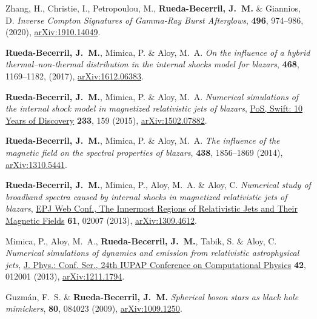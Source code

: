 \begin{thebibliography}{99}
 Zhang, H., Christie, I., Petropoulou, M., \textbf{Rueda-Becerril, J.~M.} \& Giannios, D. \textit{Inverse Compton Signatures of Gamma-Ray Burst Afterglows}, \href{https://doi.org/10.1093/mnras/staa1583}{\mnras} \textbf{496}, 974--986, (2020), \href{https://arxiv.org/abs/1910.14049}{arXiv:1910.14049}.

 \textbf{Rueda-Becerril, J.~M.}, Mimica, P. \& Aloy, M.~A. \textit{On the influence of a hybrid thermal--non-thermal distribution in the internal shocks model for blazars}, \href{https://doi.org/10.1093/mnras/stx476}{\mnras} \textbf{468}, 1169--1182, (2017), \href{https://arxiv.org/abs/1612.06383}{arXiv:1612.06383}.

 \textbf{Rueda-Becerril, J.~M.}, Mimica, P. \& Aloy, M.~A. \emph{Numerical simulations of the internal shock model in magnetized relativistic jets of blazars}, \href{https://doi.org/10.22323/1.233.0159}{PoS, Swift: 10 Years of Discovery} \textbf{233}, 159 (2015), \href{https://arxiv.org/abs/1502.07882}{arXiv:1502.07882}.

 \textbf{Rueda-Becerril, J.~M.}, Mimica, P. \& Aloy, M.~A. \textit{The influence of the magnetic field on the spectral properties of blazars}, \href{https://doi.org/10.1093/mnras/stt2335}{\mnras} \textbf{438}, 1856--1869 (2014), \href{https://arxiv.org/abs/1310.5441}{arXiv:1310.5441}.

 \textbf{Rueda-Becerril, J.~M.}, Mimica, P., Aloy, M.~A. \& Aloy, C. \emph{Numerical study of broadband spectra caused by internal shocks in magnetized relativistic jets of blazars}, \href{https://doi.org/10.1051/epjconf/20136102007}{EPJ Web Conf., The Innermost Regions of Relativistic Jets and Their Magnetic Fields} \textbf{61}, 02007 (2013), \href{https://arxiv.org/abs/1309.4612}{arXiv:1309.4612}.

 Mimica, P., Aloy, M.~A., \textbf{Rueda-Becerril, J.~M.}, Tabik, S. \& Aloy, C. \emph{Numerical simulations of dynamics and emission from relativistic astrophysical jets}, \href{https://doi.org/10.1088/1742-6596/454/1/012001}{J. Phys.: Conf. Ser., 24th IUPAP Conference on Computational Physics} \textbf{42}, 012001 (2013), \href{https://arxiv.org/abs/1211.1794}{arXiv:1211.1794}.

 Guzmán, F.~S. \& \textbf{Rueda-Becerril, J.~M.} \textit{Spherical boson stars as black hole mimickers},  \href{https://doi.org/10.1103/PhysRevD.80.084023}{\prd} \textbf{80}, 084023 (2009), \href{https://arxiv.org/abs/1009.1250}{arXiv:1009.1250}.
\end{thebibliography}


